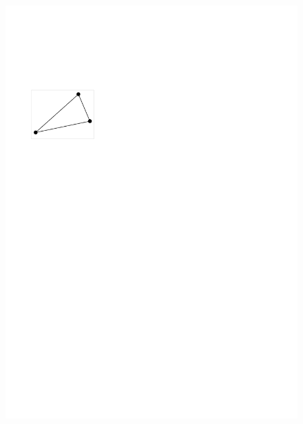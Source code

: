 \documentclass[twoside,a4paper,fleqn,12pt]{article}
\begin{document}
\begin{figure}[h]
  \centering
  \includegraphics[scale=0.8]{triraster1}
  \qquad

\end{figure}
\end{document}
